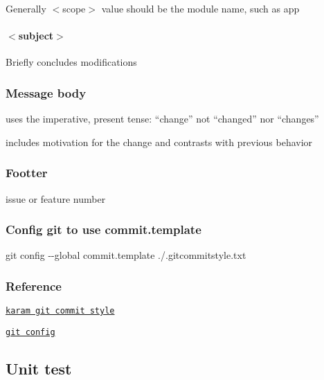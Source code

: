 Generally {\ttfamily $<$scope$>$} value should be the module name, such as {\ttfamily app}

\paragraph*{$<$subject$>$}

Briefly concludes modifications

\subsubsection*{Message body}


\begin{DoxyItemize}
\item uses the imperative, present tense\+: “change” not “changed” nor “changes”
\item includes motivation for the change and contrasts with previous behavior
\end{DoxyItemize}

\subsubsection*{Footter}

issue or feature number

\subsubsection*{Config git to use {\ttfamily commit.\+template}}

{\ttfamily git config -\/-\/global commit.\+template ./.gitcommitstyle.\+txt}

\subsubsection*{Reference}


\begin{DoxyItemize}
\item \href{http://karma-runner.github.io/4.0/dev/git-commit-msg.html}{\tt karam git commit style}
\item \href{https://git-scm.com/book/en/v2/Customizing-Git-Git-Configuration}{\tt git config}
\end{DoxyItemize}

\subsection*{Unit test}

